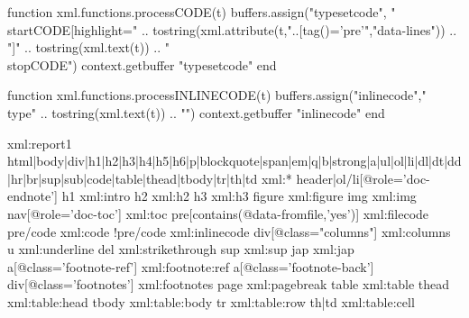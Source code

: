 


\startluacode
    function xml.functions.processCODE(t)
        buffers.assign("typesetcode",
        "\\startCODE[highlight={" ..
          tostring(xml.attribute(t,"..[tag()='pre'","data-lines"))
              .. "}]\n" .. tostring(xml.text(t)) .. "\n\\stopCODE")
        context.getbuffer { "typesetcode" }
    end

    function xml.functions.processINLINECODE(t)
        buffers.assign("inlinecode","\\type{" .. tostring(xml.text(t)) .. "}")
        context.getbuffer { "inlinecode" }
    end
\stopluacode

\startxmlsetups xml:report1
  \xmlsetsetup{\xmldocument}
    {html|body|div|h1|h2|h3|h4|h5|h6|p|blockquote|span|em|q|b|strong|a|ul|ol|li|dl|dt|dd|hr|br|sup|sub|code|table|thead|tbody|tr|th|td}
    {xml:*}
  \xmlsetsetup{\xmldocument}
    {header|ol/li[@role='doc-endnote']}
    {}
  \xmlsetsetup{\xmldocument}
    {h1}
    {xml:intro}
  \xmlsetsetup{\xmldocument}
    {h2}
    {xml:h2}
  \xmlsetsetup{\xmldocument}
    {h3}
    {xml:h3}
  \xmlsetsetup{\xmldocument}
    {figure}
    {xml:figure}
  \xmlsetsetup{\xmldocument}
    {img}
    {xml:img}
  \xmlsetsetup{\xmldocument}
    {nav[@role='doc-toc']}
    {xml:toc}
  \xmlsetsetup{\xmldocument}
    {pre[contains(@data-fromfile,'yes')]}
    {xml:filecode}
  \xmlsetsetup{\xmldocument}
    {pre/code}
    {xml:code}
  \xmlsetsetup{\xmldocument}
    {!pre/code}
    {xml:inlinecode}
  \xmlsetsetup{\xmldocument}
    {div[@class="columns"]}
    {xml:columns}
  \xmlsetsetup{\xmldocument}
    {u}
    {xml:underline}
  \xmlsetsetup{\xmldocument}
    {del}
    {xml:strikethrough}
  \xmlsetsetup{\xmldocument}
    {sup}
    {xml:sup}
  \xmlsetsetup{\xmldocument}
    {jap}
    {xml:jap}
  \xmlsetsetup{\xmldocument}
    {a[@class='footnote-ref']}
    {xml:footnote:ref}
  \xmlsetsetup{\xmldocument}
    {a[@class='footnote-back']}
    {}
  \xmlsetsetup{\xmldocument}
    {div[@class='footnotes']}
    {xml:footnotes}
  \xmlsetsetup{\xmldocument}
    {page}
    {xml:pagebreak}
  \xmlsetsetup{\xmldocument}
    {table}
    {xml:table}
  \xmlsetsetup{\xmldocument}
    {thead}
    {xml:table:head}
  \xmlsetsetup{\xmldocument}
    {tbody}
    {xml:table:body}
  \xmlsetsetup{\xmldocument}
    {tr}
    {xml:table:row}
  \xmlsetsetup{\xmldocument}
    {th|td}
    {xml:table:cell}
\stopxmlsetups

